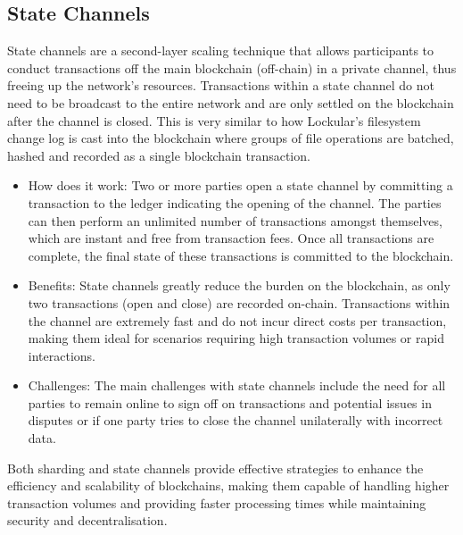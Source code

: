 \documentclass{tufte-handout}
\begin{document}
\subsection{State Channels}\label{sec:headings}
State channels are a second-layer scaling technique that allows participants to conduct transactions off the main blockchain (off-chain) in a private channel, thus freeing up the
network's resources. Transactions within a state channel do not need to be broadcast to the entire network and are only settled on the blockchain after the channel is closed. This
is very similar to how Lockular's filesystem change log is cast into the blockchain where groups of file operations are batched, hashed and recorded as a single blockchain transaction.
\begin{itemize}
\item How does it work: Two or more parties open a state channel by committing a transaction to the ledger indicating the opening of the channel. The parties can then perform an
unlimited number of transactions amongst themselves, which are instant and free from transaction fees. Once all transactions are complete, the final state of these transactions
is committed to the blockchain.
\item Benefits: State channels greatly reduce the burden on the blockchain, as only two transactions (open and close) are recorded on-chain. Transactions within the channel are
extremely fast and do not incur direct costs per transaction, making them ideal for scenarios requiring high transaction volumes or rapid interactions.
\item Challenges: The main challenges with state channels include the need for all parties to remain online to sign off on transactions and potential issues in disputes or if
one party tries to close the channel unilaterally with incorrect data.
\end{itemize}
Both sharding and state channels provide effective strategies to enhance the efficiency and scalability of blockchains, making them capable of handling higher transaction
volumes and providing faster processing times while maintaining security and decentralisation.
\end{document}
